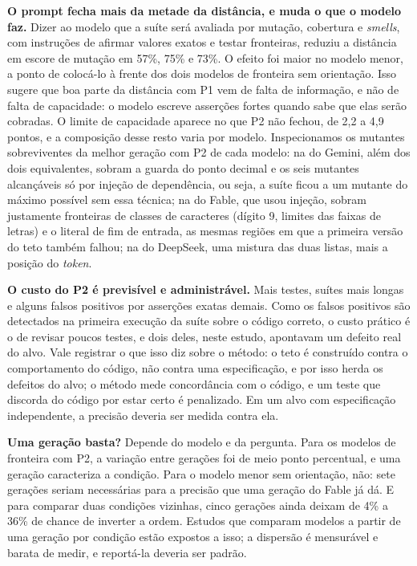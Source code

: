 \textbf{O prompt fecha mais da metade da distância, e muda o que o modelo faz.} Dizer ao modelo que a suíte será avaliada por mutação, cobertura e \textit{smells}, com instruções de afirmar valores exatos e testar fronteiras, reduziu a distância em escore de mutação em 57\%, 75\% e 73\%. O efeito foi maior no modelo menor, a ponto de colocá-lo à frente dos dois modelos de fronteira sem orientação. Isso sugere que boa parte da distância com P1 vem de falta de informação, e não de falta de capacidade: o modelo escreve asserções fortes quando sabe que elas serão cobradas. O limite de capacidade aparece no que P2 não fechou, de 2,2 a 4,9 pontos, e a composição desse resto varia por modelo. Inspecionamos os mutantes sobreviventes da melhor geração com P2 de cada modelo: na do Gemini, além dos dois equivalentes, sobram a guarda do ponto decimal e os seis mutantes alcançáveis só por injeção de dependência, ou seja, a suíte ficou a um mutante do máximo possível sem essa técnica; na do Fable, que usou injeção, sobram justamente fronteiras de classes de caracteres (dígito 9, limites das faixas de letras) e o literal de fim de entrada, as mesmas regiões em que a primeira versão do teto também falhou; na do DeepSeek, uma mistura das duas listas, mais a posição do \textit{token}.

\textbf{O custo do P2 é previsível e administrável.} Mais testes, suítes mais longas e alguns falsos positivos por asserções exatas demais. Como os falsos positivos são detectados na primeira execução da suíte sobre o código correto, o custo prático é o de revisar poucos testes, e dois deles, neste estudo, apontavam um defeito real do alvo. Vale registrar o que isso diz sobre o método: o teto é construído contra o comportamento do código, não contra uma especificação, e por isso herda os defeitos do alvo; o método mede concordância com o código, e um teste que discorda do código por estar certo é penalizado. Em um alvo com especificação independente, a precisão deveria ser medida contra ela.

\textbf{Uma geração basta?} Depende do modelo e da pergunta. Para os modelos de fronteira com P2, a variação entre gerações foi de meio ponto percentual, e uma geração caracteriza a condição. Para o modelo menor sem orientação, não: sete gerações seriam necessárias para a precisão que uma geração do Fable já dá. E para comparar duas condições vizinhas, cinco gerações ainda deixam de 4\% a 36\% de chance de inverter a ordem. Estudos que comparam modelos a partir de uma geração por condição estão expostos a isso; a dispersão é mensurável e barata de medir, e reportá-la deveria ser padrão.

